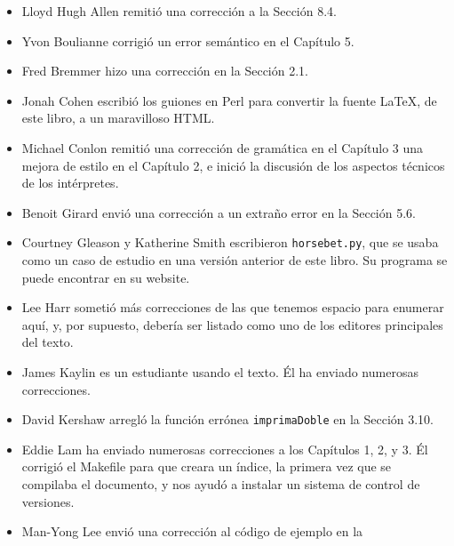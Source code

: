 \begin{itemize}
	\item Lloyd Hugh Allen remitió una corrección a la Sección 8.4.
	\item Yvon Boulianne corrigió un error semántico en el Capítulo 5.
	\item Fred Bremmer hizo una corrección en la Sección 2.1.
	\item Jonah Cohen escribió los guiones en Perl para convertir la fuente
	LaTeX, de este libro, a un maravilloso HTML.
	\item Michael Conlon remitió una corrección de gramática en el Capítulo 3
	una mejora de estilo en el Capítulo 2, e inició la discusión de 
	los aspectos técnicos de los intérpretes.
	\item Benoit Girard envió una corrección a un extraño error en la Sección 
	5.6.
	\item Courtney Gleason y Katherine Smith escribieron \texttt{horsebet.py}, 
	que
	se usaba como un caso de estudio en una versión anterior de este libro.  Su 
	programa se puede encontrar en su website.
	\item Lee Harr sometió más correcciones de las que tenemos espacio para 
	enumerar aquí, 
	y, por supuesto, debería ser listado como uno de los editores principales 
	del 
	texto.
	\item James Kaylin es un estudiante usando el texto. Él ha enviado numerosas
	correcciones.
	\item David Kershaw arregló la función errónea \texttt{imprimaDoble} en 
	la Sección 3.10.
	\item Eddie Lam ha enviado numerosas correcciones a los Capítulos 1, 2, y 
	3.  Él
	corrigió el Makefile para que creara un índice, la primera vez
	que se compilaba el documento, y  nos ayudó a instalar un sistema
	de control de versiones.
	\item Man-Yong Lee envió una corrección al código de ejemplo en la

\end{itemize}
